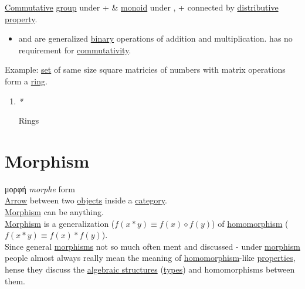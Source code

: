 \documentclass[a4paper,14pt,oneside]{book}
\begin{document}
\label{sec:org47b7953}
\hyperref[orga8d85e9]{Commutative} \hyperref[orgff36d0c]{group} under + \& \hyperref[orgb6f1b3a]{monoid} under \texttimes{}, + \texttimes{} connected by \hyperref[org46b12fa]{distributive} \hyperref[orga548a30]{property}.\\

\begin{itemize}
\item and \texttimes{} are generalized \hyperref[org0a0e962]{binary} operations of addition and multiplication. \texttimes{} has no requirement for \hyperref[orgfd6fd64]{commutativity}.\\
\end{itemize}

Example: \hyperref[orgea3d2d2]{set} of same size square matricies of numbers with matrix operations form a \hyperref[orgfca618c]{ring}.\\

\begin{enumerate}
\item \emph{*}
\label{sec:org178d224}

\label{org982fa6f}Rings\\
\end{enumerate}

\section{\label{orgb1a35cd}Morphism}
\label{sec:org7f15c76}
μορφή \emph{morphe} form\\
\hyperref[org1dec7dd]{Arrow} between two \hyperref[org40505eb]{objects} inside a \hyperref[org75ddcd0]{category}.\\

\hyperref[orgb1a35cd]{Morphism} can be anything.\\

\hyperref[orgb1a35cd]{Morphism} is a generalization (\(f(x*y) \equiv f(x) \diamond f(y)\)) of \hyperref[org2b3d60b]{homomorphism} (\(f(x*y) \equiv f(x) * f(y)\)).\\
Since general \hyperref[org19cb6ec]{morphisms} not so much often ment and discussed - under \hyperref[orgb1a35cd]{morphism} people almost always really mean the meaning of \hyperref[org2b3d60b]{homomorphism}-like \hyperref[org39b32f5]{properties}, hense they discuss the \hyperref[org7cd3b88]{algebraic structures} (\hyperref[org120e41a]{types}) and homomorphisms between them.\\
\end{document}
